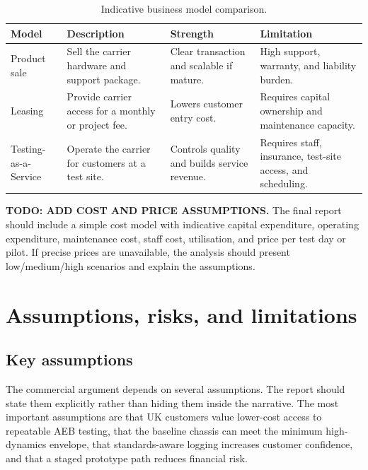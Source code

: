 \begin{table}[H]
\centering
\caption{Indicative business model comparison.}
\label{tab:business_model_compact}
\begin{tabular}{p{} p{} p{} p{}}
\toprule
\textbf{Model} & \textbf{Description} & \textbf{Strength} & \textbf{Limitation} \\
\midrule
Product sale & Sell the carrier hardware and support package. & Clear transaction and scalable if mature. & High support, warranty, and liability burden. \\
Leasing & Provide carrier access for a monthly or project fee. & Lowers customer entry cost. & Requires capital ownership and maintenance capacity. \\
Testing-as-a-Service & Operate the carrier for customers at a test site. & Controls quality and builds service revenue. & Requires staff, insurance, test-site access, and scheduling. \\
\bottomrule
\end{tabular}
\end{table}

\textbf{TODO: ADD COST AND PRICE ASSUMPTIONS.} The final report should include a simple cost model with indicative capital expenditure, operating expenditure, maintenance cost, staff cost, utilisation, and price per test day or pilot. If precise prices are unavailable, the analysis should present low/medium/high scenarios and explain the assumptions.

\section{Assumptions, risks, and limitations}

\subsection{Key assumptions}

The commercial argument depends on several assumptions. The report should state them explicitly rather than hiding them inside the narrative. The most important assumptions are that UK customers value lower-cost access to repeatable AEB testing, that the baseline chassis can meet the minimum high-dynamics envelope, that standards-aware logging increases customer confidence, and that a staged prototype path reduces financial risk.


